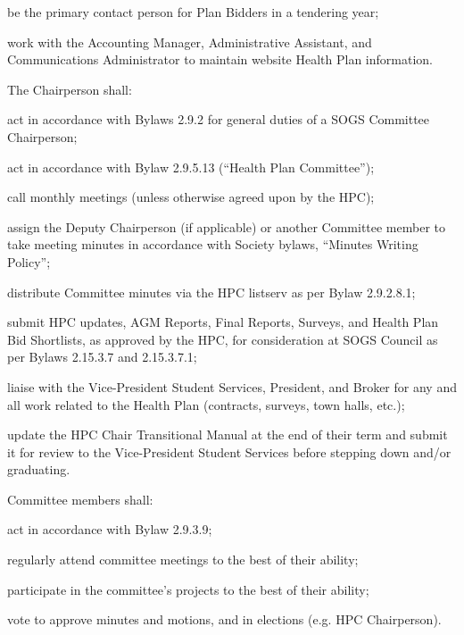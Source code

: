\begin{longenum}[ label*=\thesubsection.\arabic*., align=left]
\begin{longenum}[label*=\arabic*., align=left]
\begin{longenum}[label*=\arabic*., align=left]
		\item be the primary contact person for Plan Bidders in a tendering year;
		\item work with the Accounting Manager, Administrative Assistant, and Communications Administrator to maintain website Health Plan information.
		\end{longenum}
	\item The Chairperson shall:
		\begin{longenum}[label*=\arabic*., align=left]	
		\item act in accordance with Bylaws 2.9.2 for general duties of a SOGS Committee Chairperson;
		\item act in accordance with Bylaw 2.9.5.13 (“Health Plan Committee”);
		\item call monthly meetings (unless otherwise agreed upon by the HPC);
		\item assign the Deputy Chairperson (if applicable) or another Committee member to take meeting minutes in accordance with Society bylaws, “Minutes Writing Policy”;
		\item distribute Committee minutes via the HPC listserv as per Bylaw 2.9.2.8.1;
		\item submit HPC updates, AGM Reports, Final Reports, Surveys, and Health Plan Bid Shortlists, as approved by the HPC, for consideration at SOGS Council as per Bylaws 2.15.3.7 and 2.15.3.7.1;
		\item liaise with the Vice-President Student Services, President, and Broker for any and all work related to the Health Plan (contracts, surveys, town halls, etc.);
		\item update the HPC Chair Transitional Manual at the end of their term and submit it for review to the Vice-President Student Services before stepping down and/or graduating.
		\end{longenum}
	\item Committee members shall:
		\begin{longenum}[label*=\arabic*., align=left]	
		\item act in accordance with Bylaw 2.9.3.9;
		\item regularly attend committee meetings to the best of their ability;
		\item participate in the committee’s projects to the best of their ability;
		\item vote to approve minutes and motions, and in elections (e.g. HPC Chairperson).
		\end{longenum}
	\end{longenum}

\end{longenum}
